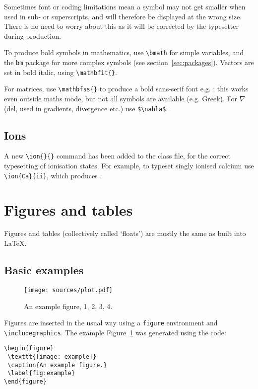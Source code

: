 \documentclass[fleqn,usenatbib,useAMS]{mnras}
\begin{document}
Sometimes font or coding limitations mean a symbol may not get smaller when used in sub- or superscripts, and will therefore be displayed at the wrong size. There is no need to worry about this as it will be corrected by the typesetter during production.

To produce bold symbols in mathematics, use \verb'\bmath' for simple variables, and the \verb'bm' package for more complex symbols (see section~\ref{sec:packages}). Vectors are set in bold italic, using \verb'\mathbfit{}'.

For matrices, use \verb'\mathbfss{}' to produce a bold sans-serif font e.g. ; this works even outside maths mode, but not all symbols are available (e.g. Greek). For $\nabla$ (del, used in gradients, divergence etc.) use \verb'$\nabla$'.

\subsection{Ions}

A new \verb'\ion{}{}' command has been added to the class file, for the correct typesetting of ionisation states.
For example, to typeset singly ionised calcium use \verb'\ion{Ca}{ii}', which produces .

\section{Figures and tables}
\label{sec:fig_table}
Figures and tables (collectively called `floats') are mostly the same as built into \LaTeX.

\subsection{Basic examples}
\begin{figure}
 \texttt{[image: sources/plot.pdf]}
 \caption{An example figure, 1, 2, 3, 4.}
 \label{fig:example}
\end{figure}
Figures are inserted in the usual way using a \verb'figure' environment and \verb'\includegraphics'. The example Figure~\ref{fig:example} was generated using the code:
\begin{verbatim}
\begin{figure}
 \texttt{[image: example]}
 \caption{An example figure.}
 \label{fig:example}
\end{figure}
\end{verbatim}
\end{document}
